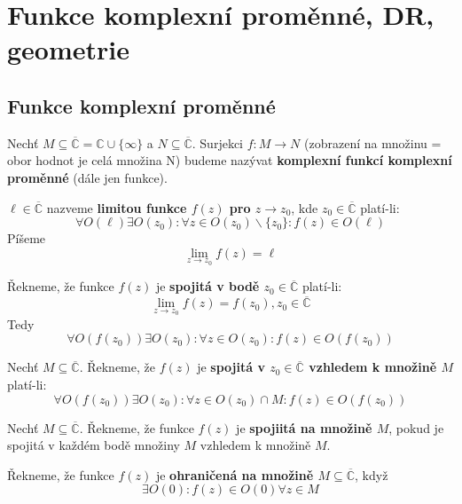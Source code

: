 \chapter{Funkce komplexní proměnné, DR, geometrie}

\section{Funkce komplexní proměnné}

\begin{definition}
Nechť $M\subseteq \overline{\mathbb{C}}=\mathbb{C}\cup \{\infty\}$ a $N\subseteq \mathbb{\overline{C}}$. Surjekci $f:M\rightarrow N$    (zobrazení na množinu = obor hodnot je celá množina N) budeme nazývat \textbf{komplexní funkcí komplexní proměnné} (dále jen funkce).
\end{definition}

\begin{definition}
$\ell\in\mathbb{\overline{C}}$ nazveme \textbf{limitou funkce $f(z)$ pro $z\rightarrow z_0$}, kde $z_0\in\mathbb{\overline{C}}$ platí-li: $$\forall O(\ell) \exists O(z_0): \forall z\in O(z_0)\backslash\{z_0\}: f(z)\in O(\ell)$$
Píšeme $$\lim_{z\to z_0}f(z)=\ell$$
\end{definition}

\begin{definition}
Řekneme, že funkce $f(z)$ je \textbf{spojitá v bodě $z_0\in\mathbb{\overline{C}}$} platí-li:
$$\lim_{z\to z_0}f(z)=f(z_0), z_0\in\mathbb{\overline{C}}$$
Tedy $$\forall O(f(z_0)) \exists O(z_0): \forall z\in O(z_0): f(z)\in O(f(z_0))$$
\end{definition}

\begin{definition}
Nechť $M\subseteq \overline{\mathbb{C}}$. Řekneme, že $f(z)$ je \textbf{spojitá v $z_0\in\overline{\mathbb{C}}$ vzhledem k množině $M$} platí-li: $$\forall O(f(z_0)) \exists O(z_0): \forall z\in O(z_0)\cap M: f(z)\in O(f(z_0))$$ 
\end{definition}

\begin{definition}
Nechť $M\subseteq \overline{\mathbb{C}}$. Řekneme, že funkce $f(z)$ je \textbf{spojiitá na množině $M$}, pokud je spojitá v každém bodě množiny $M$ vzhledem k množině $M$.
\end{definition}

\begin{definition}
Řekneme, že funkce $f(z)$ je \textbf{ohraničená na množině $M\subseteq \overline{\mathbb{C}}$}, když
$$\exists O(0): f(z)\in O(0) \forall z\in M$$
\end{definition}

